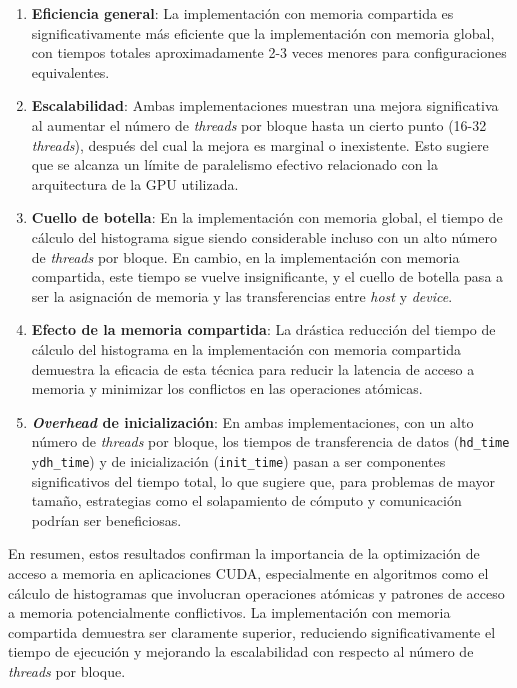         \begin{enumerate}

            \item \textbf{Eficiencia general}: La implementación con memoria compartida es significativamente más eficiente que la implementación con memoria global, con tiempos totales aproximadamente 2-3 veces menores para configuraciones equivalentes.
            
            \item \textbf{Escalabilidad}: Ambas implementaciones muestran una mejora significativa al aumentar el número de \textit{threads} por bloque hasta un cierto punto (16-32 \textit{threads}), después del cual la mejora es marginal o inexistente. Esto sugiere que se alcanza un límite de paralelismo efectivo relacionado con la arquitectura de la GPU utilizada.
            
            \item \textbf{Cuello de botella}: En la implementación con memoria global, el tiempo de cálculo del histograma sigue siendo considerable incluso con un alto número de \textit{threads} por bloque. En cambio, en la implementación con memoria compartida, este tiempo se vuelve insignificante, y el cuello de botella pasa a ser la asignación de memoria y las transferencias entre \textit{host} y \textit{device}.
            
            \item \textbf{Efecto de la memoria compartida}: La drástica reducción del tiempo de cálculo del histograma en la implementación con memoria compartida demuestra la eficacia de esta técnica para reducir la latencia de acceso a memoria y minimizar los conflictos en las operaciones atómicas.
            
            \item \textbf{\textit{Overhead} de inicialización}: En ambas implementaciones, con un alto número de \textit{threads} por bloque, los tiempos de transferencia de datos (\texttt{hd\_time} y\texttt{dh\_time}) y de inicialización (\texttt{init\_time}) pasan a ser componentes significativos del tiempo total, lo que sugiere que, para problemas de mayor tamaño, estrategias como el solapamiento de cómputo y comunicación podrían ser beneficiosas.
                     
        \end{enumerate}
        
        En resumen, estos resultados confirman la importancia de la optimización de acceso a memoria en aplicaciones CUDA, especialmente en algoritmos como el cálculo de histogramas que involucran operaciones atómicas y patrones de acceso a memoria potencialmente conflictivos. La implementación con memoria compartida demuestra ser claramente superior, reduciendo significativamente el tiempo de ejecución y mejorando la escalabilidad con respecto al número de \textit{threads} por bloque.
       
